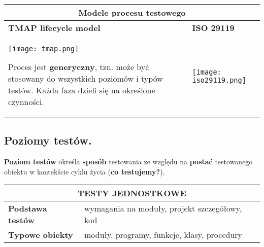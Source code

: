 \documentclass[../main.tex]{subfiles}
\begin{document}
    \begin{table}[H]
        \begin{center}
            \begin{tabular}{| p{8cm}| p{8cm}|}
                \hline
                \multicolumn{2}{|c|}{    \textbf{Modele procesu testowego}}\\
                \hline
                \textbf{TMAP lifecycle model} &  \textbf{ISO 29119}\\
                \hline

                \texttt{[image: tmap.png]}

                Proces jest \textbf{generyczny}, tzn. może być stosowany do wszystkich
                poziomów i typów testów. Każda faza dzieli się na określone czynności.
                &

                \texttt{[image: iso29119.png]}\\

                \hline

            \end{tabular}
        \end{center}
    \end{table}

    \subsection{Poziomy testów.}

    \textbf{Poziom testów} określa \textbf{sposób} testowania ze względu na \textbf{postać}
    testowanego obiektu w kontekście cyklu życia (\textbf{co testujemy?}).


    \begin{table}[H]
        \begin{center}
            \begin{tabular}{| p{8cm}| p{8cm}|}
                \hline
                \multicolumn{2}{|c|}{ \textbf{TESTY JEDNOSTKOWE}}\\
                \hline
                \textbf{Podstawa testów} & wymagania na moduły, projekt szczegółowy, kod\\
                \hline
                \textbf{Typowe obiekty} & moduły, programy, funkcje, klasy, procedury\\
                \hline
            \end{tabular}
        \end{center}
    \end{table}
\end{document}
